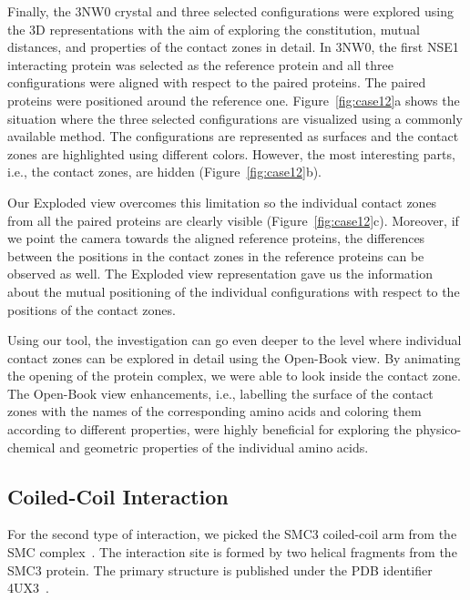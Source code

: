 \documentclass[twocolumn]{bmcart}%
\def\OpBook {Open-Book view\xspace}
\def\ExpView {Exploded view\xspace}
\begin{document}
Finally, the 3NW0 crystal and three selected configurations were explored using the 3D representations with the aim of exploring the constitution, mutual distances, and properties of the contact zones in detail.
In 3NW0, the first NSE1 interacting protein was selected as the reference protein and all three configurations were aligned with respect to the paired proteins.
The paired proteins were positioned around the reference one.
Figure~\ref{fig:case12}a shows the situation where the three selected configurations are visualized using a commonly available method.
The configurations are represented as surfaces and the contact zones are highlighted using different colors.
However, the most interesting parts, i.e., the contact zones, are hidden (Figure~\ref{fig:case12}b).

Our \ExpView overcomes this limitation so the individual contact zones from all the paired proteins are clearly visible (Figure~\ref{fig:case12}c).
Moreover, if we point the camera towards the aligned reference proteins, the differences between the positions in the contact zones in the reference proteins can be observed as well.
The \ExpView representation gave us the information about the mutual positioning of the individual configurations with respect to the positions of the contact zones.

Using our tool, the investigation can go even deeper to the level where individual contact zones can be explored in detail using the \OpBook.
By animating the opening of the protein complex, we were able to look inside the contact zone.
The \OpBook enhancements, i.e., labelling the surface of the contact zones with the names of the corresponding amino acids and coloring them according to different properties, were highly beneficial for exploring the physico-chemical and geometric properties of the individual amino acids.

\subsection*{Coiled-Coil Interaction}
For the second type of interaction, we picked the SMC3 coiled-coil arm from the SMC complex~\cite{Gligoris}.
The interaction site is formed by two helical fragments from the SMC3 protein.
The primary structure is published under the PDB identifier 4UX3~\cite{pmid25414305}.
\end{document}
